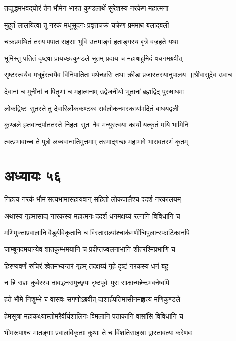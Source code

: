 \twolineshloka
{तद्युद्धमभवद्घोरं तेन भौमेन भारत}
{कुण्डलार्थे सुरेशस्य नरकेण महात्मना}


\twolineshloka
{मुहूर्तं लालयित्वा तु नरकं मधूसूदनः}
{प्रवृत्तचक्रं चक्रेण प्रममाथ बलाद्बली}


\twolineshloka
{चक्रप्रमथितं तस्य पपात सहसा भुवि}
{उत्तमाङ्गं हताङ्गस्य वृत्रे वज्रहते यथा}


\twolineshloka
{भूमिस्तु पतितं दृष्ट्वा प्रायच्छत्कुण्डले सुतम्}
{प्रदाय च महाबाहुमिदं वचनमब्रवीत्}


\threelineshloka
{सृष्टस्त्वयैव मधुहंस्त्वयैव विनिपातितः}
{यथेच्छसि तथा क्रीडा प्रजास्तस्यानुपालय ॥श्रीवासुदेव उवाच}
{}


\twolineshloka
{देवानां च मुनीनां च पितॄणां च महात्मनाम्}
{उद्वेजनीयो भूतानां ब्रह्मद्विद् पुरुषाधमः}


\twolineshloka
{लोकद्विष्टः सुतस्ते तु देवारिर्लोककण्टकः}
{सर्वलोकनमस्कार्यामदितं बाधयद्वली}


\twolineshloka
{कुण्डले हृतवान्दर्पात्ततस्ते निहतः सुतः}
{नैव मन्युस्त्वया कार्यो यत्कृतं मयि भामिनि}


\twolineshloka
{त्वत्प्रभावाच्च ते पुत्रो लब्धवान्गतिमुत्तमाम्}
{तस्माद्गच्छ महाभागे भारावतरणं कृतम्}


\chapter{अध्यायः ५६}
\twolineshloka
{निहत्य नरकं भौमं सत्यभामासहायवान्}
{सहितो लोकपालैश्च ददर्श नरकालयम्}


\threelineshloka
{अथास्य गृहमासाद्य नारकस्य महात्मनः}
{ददर्श धनमक्षय्यं रत्नानि विविधानि च}
{}


\twolineshloka
{मणिमुक्ताप्रवालानि वैडूर्यविकृतानि च}
{विस्ताराल्पांश्चार्कमणीन्विपुलान्स्फाटिकानपि}


\twolineshloka
{जाम्बूनदमयान्येव शातकुम्भमयानि च}
{प्रदीप्तज्वलनाभानि शीतरश्मिप्रभाणि च}


\twolineshloka
{हिरण्यवर्णं रुचिरं श्वेतमभ्यन्तरं गृहम्}
{तदक्षय्यं गृहे दृष्टं नरकस्य धनं बहु}


\twolineshloka
{न हि राज्ञः कुबेरस्य तावद्धनसमुच्छ्रयः}
{दृष्टपूर्वः पुरा साक्षान्महेन्द्रभवनेष्वपि}


\twolineshloka
{हते भौमे निशुम्भे च वासवः सगणोऽब्रवीत्}
{दाशार्हपतिमासीनमाहृत्य मणिकुण्डले}


\twolineshloka
{हेमसूत्रा महाकक्ष्यास्तोमरैर्वीर्यशालिनः}
{विमलानि पताकानि वासांसि विविधानि च}


\twolineshloka
{भीमरूपाश्च मातङ्गाः प्रवालविकृताः कुथाः}
{ते च विंशतिसाहस्रा द्वास्तावत्यः करेणवः}


